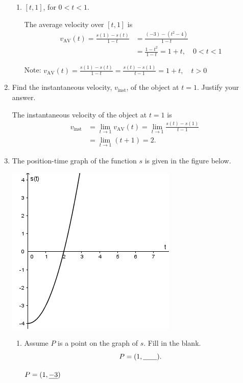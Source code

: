 \documentclass[nooutcomes,handout]{ximera}
\begin{document}
\begin{problem}
\begin{enumerate}
\begin{enumerate}
\item
$[t, 1]$, for $0 < t < 1$.
\begin{freeResponse}
The average velocity over $[t, 1]$ is
\begin{align*}
v_{\mathrm{AV}}(t)=\frac{s(1) - s(t)}{1-t} &=\frac{(-3) - (t^2-4)}{1-t}\\
&= \frac{1-t^2}{1-t} = 1+t, \quad 0<t<1
\end{align*}

Note: $v_{\mathrm{AV}}(t)=\frac{s(1) - s(t)}{1-t}= \frac{s(t) - s(1)}{t-1}=1+t, \quad t>0$
\end{freeResponse}
\end{enumerate}

\item 
Find the instantaneous velocity, $v_{\mathrm{inst}}$, of the object at $t = 1$.
Justify your answer.
\begin{freeResponse}
The instantaneous velocity of the object at $t = 1$ is
\begin{align*}
v_{\mathrm{inst}} &=\lim_{t \to 1}v_{\mathrm{AV}}(t)= \lim_{t \to 1} \frac{s(t) - s(1)}{t-1} \\
&= \lim_{t \to 1} (t+1) = 2.
\end{align*}
\end{freeResponse}


\item
The position-time graph of the function $s$ is given in the figure below.
\begin{image}
\includegraphics[scale = .7]{Figure10.png}
\end{image}
\begin{enumerate}
\item
Assume $P$ is a point on the graph of $s$.
Fill in the blank.
\[
P = (1, \mbox{\underline{\hspace{2em}}}).
\]
\begin{freeResponse}
$P = (1, \mbox{\underline{$-3$}})$
\end{freeResponse}



\end{enumerate}
\end{enumerate}
\end{problem}
\end{document}

